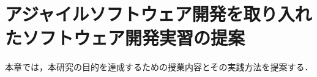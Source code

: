 \chapter{
  アジャイルソフトウェア開発を取り入れたソフトウェア開発実習の提案
  \label{proposal}
}

本章では，本研究の目的を達成するための授業内容とその実践方法を提案する．






